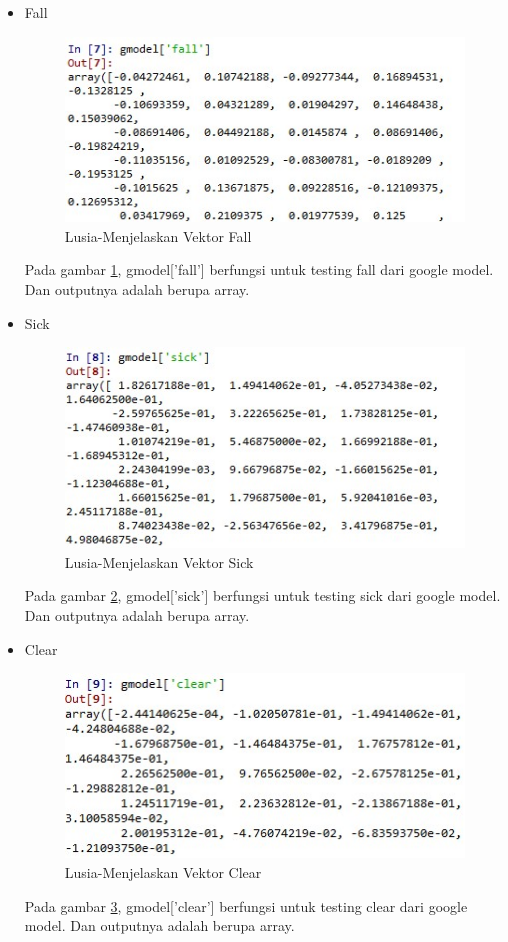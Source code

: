 \begin{enumerate}
\begin{enumerate}
\begin{itemize}
				\item Fall
				\begin{figure}[!hbtp]
					\centering
					\includegraphics[scale=0.39]{figures/chap5c.jpg}
					\caption{Lusia-Menjelaskan Vektor Fall}
					\label{5b4}
					\end{figure}
					\par Pada gambar \ref{5b4}, gmodel['fall'] berfungsi untuk testing fall dari google model. Dan outputnya adalah berupa array. 
					
				\item Sick
					\begin{figure}[!hbtp]
					\centering
					\includegraphics[scale=0.37]{figures/chap5d.jpg}
					\caption{Lusia-Menjelaskan Vektor Sick}
					\label{5b5}
					\end{figure}
					\par Pada gambar \ref{5b5}, gmodel['sick'] berfungsi untuk testing sick dari google model. Dan outputnya adalah berupa array. 
					
				\item Clear
					\begin{figure}[!hbtp]
					\centering
					\includegraphics[scale=0.4]{figures/chap5e.jpg}
					\caption{Lusia-Menjelaskan Vektor Clear}
					\label{5b6}
					\end{figure}
					\par Pada gambar \ref{5b6}, gmodel['clear'] berfungsi untuk testing clear dari google model. Dan outputnya adalah berupa array. 
					

\end{itemize}
\end{enumerate}
\end{enumerate}
